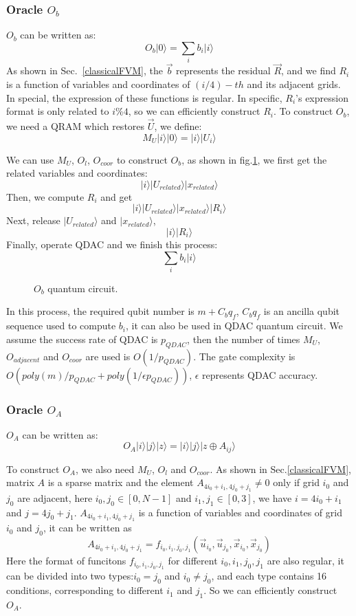 \documentclass[%
 reprint,
 amsmath,amssymb,
pra,
]{revtex4-1}
\begin{document}
\subsubsection{Oracle $O_b$}
$O_b$ can be written as:
$$
O_b|0\rangle=\sum_i{b_i|i\rangle}
$$
As shown in Sec.~\ref{classicalFVM}, the $\vec{b}$ represents the residual $\vec{R}$, and we find $R_i$ is a function of variables and coordinates of $(i/4)-th$ and its adjacent grids. In special, the expression of these functions is regular. In specific, $R_i$'s expression format is only related to $i\%4$, so we can efficiently construct $R_i$. To construct $O_b$, we need a QRAM which restores $\vec{U}$, we define:
$$
M_U|i\rangle|0\rangle=|i\rangle|U_i\rangle
$$

We can use $M_U$, $O_l$, $O_{coor}$ to construct $O_b$, as shown in fig.\ref{OB}, we first get the related variables and coordinates:
$$
|i\rangle|U_{related}\rangle|x_{related}\rangle
$$
Then, we compute $R_i$ and get
$$
|i\rangle|U_{related}\rangle|x_{related}\rangle|R_i\rangle
$$
Next, release $|U_{related}\rangle$ and $|x_{related}\rangle$,
$$
|i\rangle|R_i\rangle
$$
Finally, operate QDAC and we finish this process:
$$
\sum_i{b_i|i\rangle}
$$

\begin{figure}[htbp]
    \caption{$O_b$ quantum circuit. }
    \label{OB}
\end{figure}

In this process, the required qubit number is $m+C_bq_f$, $C_bq_f$ is an ancilla qubit sequence used to compute $b_i$, it can also be used in QDAC quantum circuit. We assume the success rate of QDAC is $p_{QDAC}$, then the number of times $M_U$, $O_{adjacent}$ and $O_{coor}$ are used is $O(1/p_{QDAC})$. The gate complexity is $O(poly(m)/p_{QDAC}+poly(1/\epsilon p_{QDAC}))$, $\epsilon$ represents QDAC accuracy.


\subsubsection{Oracle $O_A$}
$O_A$ can be written as:
$$
O_A|i\rangle|j\rangle|z\rangle=|i\rangle|j\rangle|z\oplus A_{ij}\rangle
$$

To construct $O_A$, we also need $M_U$, $O_l$ and $O_{coor}$. As shown in Sec.\ref{classicalFVM}, matrix $A$ is a sparse matrix and the element $A_{4i_0+i_1,4j_0+j_1}\neq0$ only if grid $i_0$ and $j_0$ are adjacent, here $i_0,j_0\in[0,N-1]$ and $i_1,j_1\in[0,3]$, we have $i=4i_0+i_1$ and $j=4j_0+j_1$. $A_{4i_0+i_1,4j_0+j_1}$ is a function of variables and coordinates of grid $i_0$ and $j_0$, it can be written as
$$
A_{4i_0+i_1,4j_0+j_1}=f_{i_0,i_1,j_0,j_1}(\vec{u}_{i_0},\vec{u}_{j_0},\vec{x}_{i_0},\vec{x}_{j_0})
$$
Here the format of funcitons $f_{i_0,i_1,j_0,j_1}$ for different $i_0,i_1,j_0,j_1$ are also regular, it can be divided into two types:$i_0=j_0$ and $i_0\neq j_0$, and each type contains 16 conditions, corresponding to different $i_1$ and $j_1$. So we can efficiently construct $O_A$.
\end{document}
